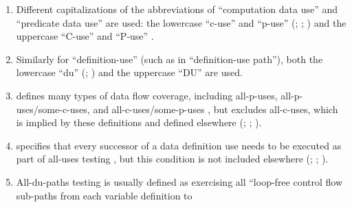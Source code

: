 \begin{enumerate}
    \item %
          Different capitalizations of the abbreviations of ``computation data
          use'' and ``predicate data use'' are used: the lowercase ``\acs{c-use}''
          and ``\acs{p-use}'' (\citealp[pp.~3, 27-29, 35-36, 114-155, 117-118,
              129]{IEEE2021}; \citeyear[p.~124]{IEEE2017};
          \citealp[p.~477, Tab.~12.6]{PetersAndPedrycz2000}) and the uppercase
          ``C-use'' and ``P-use'' \citep[pp.~424-425]{vanVliet2000}.
    \item %
          Similarly for ``definition-use'' (such as in ``definition-use
          path''), both the lowercase ``du'' (\citealp[pp.~3, 27, 29, 35,
              119-121, 129]{IEEE2021}; \citealp[pp.~478-479]{
              PetersAndPedrycz2000}) and the uppercase ``DU''
          \citep[p.~425]{vanVliet2000} are used.
    \item %
           {} defines many types of data flow
          coverage, including all-\acsp{p-use}, all-\acsp{p-use}/some-\acsp{c-use}, and
          all-\acsp{c-use}/some-\acsp{p-use} \citeyearpar[p.~425]{vanVliet2000}, but
          excludes all-\acsp{c-use}, which is implied by these definitions and
          defined elsewhere (\citealp[p.~27]{IEEE2021};
          \citeyear[p.~83]{IEEE2017}; \citealp[p.~479]{PetersAndPedrycz2000}).
    \item %
           {} specifies that every successor
          of a data definition use needs to be executed as part of all-uses
          testing \citeyearpar[pp.~424-425]{vanVliet2000}, but this condition
          is not included elsewhere (\citealp[pp.~28-29]{IEEE2021};
          \citeyear[p.~120]{IEEE2017}; \citealp[pp.~478-479]{PetersAndPedrycz2000}).
    \item %
          All-\acsp{du-path} testing is usually defined as exercising all
          ``loop-free control flow sub-paths from each variable definition to

\end{enumerate}
